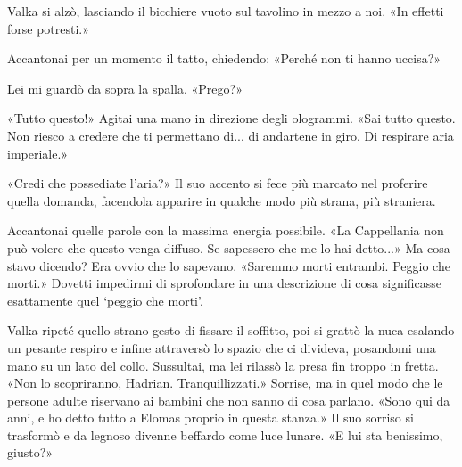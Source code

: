 Valka si alzò, lasciando il bicchiere vuoto sul tavolino in mezzo a noi.
«In effetti forse potresti.»

Accantonai per un momento il tatto, chiedendo: «Perché non ti hanno
uccisa?»

Lei mi guardò da sopra la spalla. «Prego?»

«Tutto questo!» Agitai una mano in direzione degli ologrammi. «Sai tutto
questo. Non riesco a credere che ti permettano di... di andartene in
giro. Di respirare aria imperiale.»

«Credi che possediate l'aria?» Il suo accento si fece più marcato nel
proferire quella domanda, facendola apparire in qualche modo più strana,
più straniera.

Accantonai quelle parole con la massima energia possibile. «La
Cappellania non può volere che questo venga diffuso. Se sapessero che me
lo hai detto...» Ma cosa stavo dicendo? Era ovvio che lo sapevano.
«Saremmo morti entrambi. Peggio che morti.» Dovetti impedirmi di
sprofondare in una descrizione di cosa significasse esattamente quel
`peggio che morti'.

Valka ripeté quello strano gesto di fissare il soffitto, poi si grattò
la nuca esalando un pesante respiro e infine attraversò lo spazio che ci
divideva, posandomi una mano su un lato del collo. Sussultai, ma lei
rilassò la presa fin troppo in fretta. «Non lo scopriranno, Hadrian.
Tranquillizzati.» Sorrise, ma in quel modo che le persone adulte
riservano ai bambini che non sanno di cosa parlano. «Sono qui da anni, e
ho detto tutto a Elomas proprio in questa stanza.» Il suo sorriso si
trasformò e da legnoso divenne beffardo come luce lunare. «E lui sta
benissimo, giusto?»


